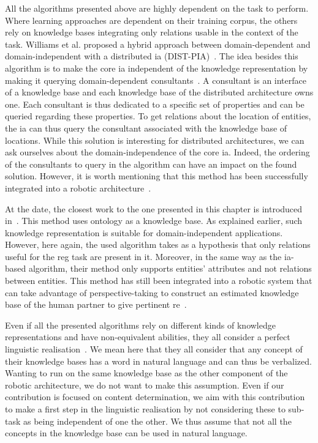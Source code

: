 All the algorithms presented above are highly dependent on the task to perform. Where learning approaches are dependent on their training corpus, the others rely on knowledge bases integrating only relations usable in the context of the task. Williams et al. proposed a hybrid approach between domain-dependent and domain-independent with a distributed \acrlong{ia} (DIST-PIA)~\cite{williams_2017_referring}. The idea besides this algorithm is to make the core \acrlong{ia} independent of the knowledge representation by making it querying domain-dependent consultants~\cite{williams_2016_framework}. A consultant is an interface of a knowledge base and each knowledge base of the distributed architecture owns one. Each consultant is thus dedicated to a specific set of properties and can be queried regarding these properties. To get relations about the location of entities, the \acrlong{ia} can thus query the consultant associated with the knowledge base of locations. While this solution is interesting for distributed architectures, we can ask ourselves about the domain-independence of the core \acrlong{ia}. Indeed, the ordering of the consultants to query in the algorithm can have an impact on the found solution. However, it is worth mentioning that this method has been successfully integrated into a robotic architecture~\cite{williams_2019_dempster}.

At the date, the closest work to the one presented in this chapter is introduced in~\cite{ros_2010_which}. This method uses ontology as a knowledge base. As explained earlier, such knowledge representation is suitable for domain-independent applications. However, here again, the used algorithm takes as a hypothesis that only relations useful for the \acrshort{reg} task are present in it. Moreover, in the same way as the \acrshort{ia}-based algorithm, their method only supports entities' attributes and not relations between entities. This method has still been integrated into a robotic system that can take advantage of perspective-taking to construct an estimated knowledge base of the human partner to give pertinent \acrshort{re}~\cite{lemaignan_2011_grounding}.

Even if all the presented algorithms rely on different kinds of knowledge representations and have non-equivalent abilities, they all consider a perfect linguistic realisation~\cite{krahmer_2012_computational}. We mean here that they all consider that any concept of their knowledge bases has a word in natural language and can thus be verbalized. Wanting to run on the same knowledge base as the other component of the robotic architecture, we do not want to make this assumption. Even if our contribution is focused on content determination, we aim with this contribution to make a first step in the linguistic realisation by not considering these to sub-task as being independent of one the other. We thus assume that not all the concepts in the knowledge base can be used in natural language.

